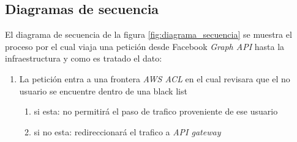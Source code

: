     \subsection{Diagramas de secuencia}
        El diagrama de secuencia de la figura \ref{fig:diagrama_secuencia} se muestra el proceso por el cual viaja una petición desde Facebook \textit{Graph API} hasta la infraestructura y como es tratado el dato:
        \begin{enumerate}
            \item La petición entra a una frontera \textit{AWS ACL} en el cual revisara que el no usuario se encuentre dentro de una black list
            \begin{enumerate}
                \item si esta: no permitirá el paso de trafico proveniente de ese usuario
                \item si no esta: redireccionará el trafico a \textit{API gateway}
                \begin{enumerate}


\end{enumerate}
\end{enumerate}
\end{enumerate}
